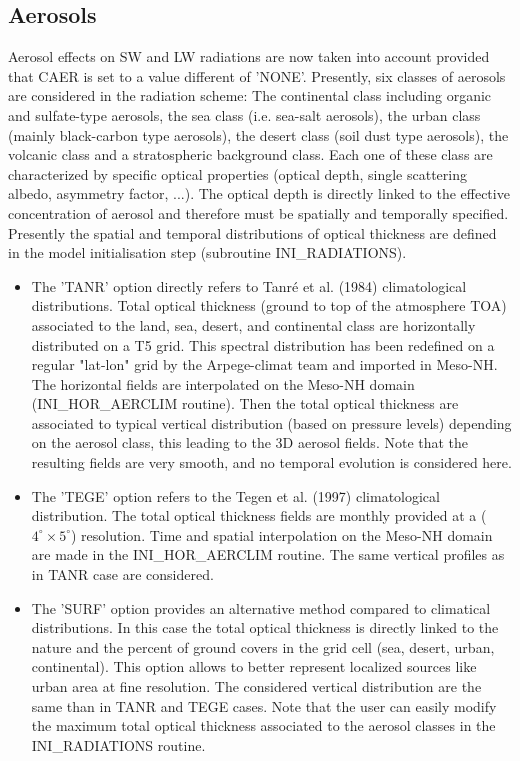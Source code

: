 \subsection{Aerosols}

Aerosol effects on SW and LW radiations are now taken into account provided that CAER is set to a value different of 'NONE'. Presently, six classes of aerosols are considered in the radiation scheme: The continental class including organic and sulfate-type aerosols, the sea class (i.e. sea-salt aerosols), the urban class (mainly  black-carbon type aerosols), the desert class (soil dust type aerosols), the volcanic class and a stratospheric background class. Each one of these class are characterized by specific optical properties (optical depth, single scattering albedo, asymmetry factor, ...). The optical depth is directly linked to the effective concentration of aerosol and therefore must be spatially and temporally specified. Presently the spatial and temporal distributions of optical thickness are defined in the model initialisation step (subroutine INI\_RADIATIONS).  

\begin{itemize}

\item The 'TANR' option directly refers to Tanr\'e et al. (1984)
  climatological distributions. Total optical thickness (ground to top
  of the atmosphere TOA) associated to the land, sea, desert, and continental class are horizontally distributed on a T5 grid. This spectral distribution has been redefined on a regular "lat-lon" grid by the Arpege-climat team and imported in Meso-NH. The horizontal fields are interpolated on the Meso-NH domain (INI\_HOR\_AERCLIM routine). Then the total optical thickness are associated to typical vertical distribution (based on pressure levels) depending on the aerosol class, this leading to the 3D aerosol fields. Note that the resulting fields are very smooth, and no temporal evolution is considered here.  

\item The 'TEGE' option refers to the Tegen et al. (1997) climatological distribution. The total optical thickness fields are monthly provided at a ($4^\circ \times 5^\circ$) resolution. Time and spatial interpolation on the Meso-NH domain are made in the INI\_HOR\_AERCLIM routine. The same vertical profiles as in TANR case are considered. 

\item The 'SURF' option provides an alternative method compared to climatical distributions. In this case the total optical thickness is directly linked to the nature and the percent of ground covers in the grid cell (sea, desert, urban, continental). This option allows to better represent localized sources like urban area at fine resolution. The considered vertical distribution are the same than in TANR and TEGE cases. Note that the user can easily modify the maximum total optical thickness associated to the aerosol classes in the INI\_RADIATIONS routine.

\end{itemize}


